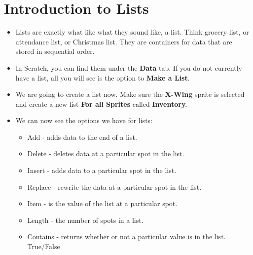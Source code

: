 \documentclass[12pt]{article}
\begin{document}
\section *{Introduction to Lists}
	\begin{itemize}
		\item Lists are exactly what like what they sound like, a list. Think grocery list, or attendance list, or Christmas list. They are containers for data that are stored in sequential order. 

		\item In Scratch, you can find them under the \textbf{Data} tab. If you do not currently have a list, all you will see is the option to \textbf{Make a List}. 

		\item We are going to create a list now. Make sure the \textbf{X-Wing} sprite is selected and create a new list \textbf{For all Sprites} called \textbf{Inventory.} 

		\item We can now see the options we have for lists:

		\begin{itemize}
    		\item{Add - adds data to the end of a list.}
    		\item{Delete - deletes data at a particular spot in the list.}
    		\item{Insert - adds data to a particular spot in the list.}
    		\item{Replace - rewrite the data at a particular spot in the list.}
    		\item{Item - is the value of the list at a particular spot.}
    		\item{Length - the number of spots in a list.}
    		\item{Contains - returns whether or not a particular value is in the list. True/False}
    	\end{itemize}

	\end{itemize}







 
\end{document}
